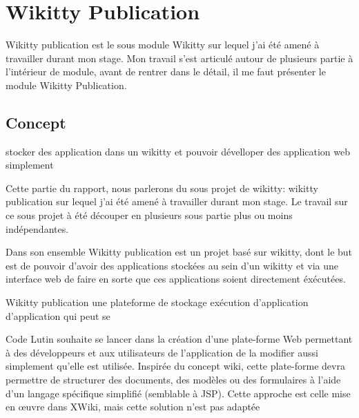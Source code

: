 \section{Wikitty Publication}

Wikitty publication est le sous module Wikitty sur lequel j'ai été amené à 
travailler durant mon stage. Mon travail s'est articulé autour de plusieurs
partie à l'intérieur de module, avant de rentrer dans le détail, il me faut 
présenter le module Wikitty Publication.

\subsection{Concept}

stocker des application dans un wikitty et pouvoir 
dévelloper des application web simplement 


Cette partie du rapport, nous parlerons du sous projet de wikitty: wikitty
publication sur lequel j'ai été amené à travailler durant mon stage. 
Le travail sur ce sous projet à été découper en plusieurs sous partie plus ou
moins indépendantes. 

Dans son ensemble Wikitty publication est un projet basé sur wikitty, dont le
but est de pouvoir d'avoir des applications stockées au sein d'un wikitty et
via une interface web de faire en sorte que ces applications soient directement
éxécutées. 

Wikitty publication une plateforme de stockage exécution d'application
d'application qui peut se





Code Lutin souhaite se lancer dans la création d'une plate-forme Web permettant à des développeurs
et aux utilisateurs de l'application de la modifier aussi simplement qu'elle est utilisée.
Inspirée du concept wiki, cette plate-forme devra permettre de structurer des documents, des
modèles ou des formulaires à l'aide d'un langage spécifique simplifié (semblable à JSP). Cette
approche est celle mise en œuvre dans XWiki, mais cette solution n'est pas adaptée


